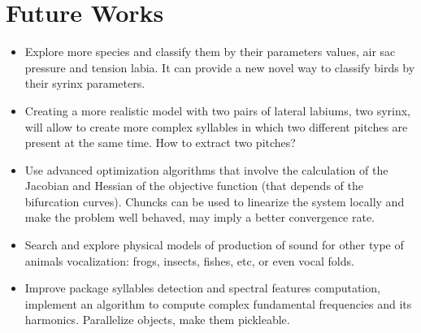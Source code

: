 \section{Future Works}

\begin{itemize}
    \item Explore more species and classify them by their parameters values, air sac pressure and tension labia. It can provide a new novel way to classify birds by their syrinx parameters.
    
    \item Creating a more realistic model with two pairs of lateral labiums, two syrinx, will allow to create more complex syllables in which two different pitches are present at the same time. How to extract two pitches?
    
    \item Use advanced optimization algorithms that involve the calculation of the Jacobian and Hessian of the objective function (that depends of the bifurcation curves). Chuncks can be used to linearize the system locally and make the problem well behaved, may imply a better convergence rate.
    
    \item Search and explore physical models of production of sound for other type of animals vocalization: frogs, insects, fishes, etc, or even vocal folds.
    
    \item Improve package syllables detection and spectral features computation, implement an algorithm to compute complex fundamental frequencies and its harmonics. Parallelize objects, make them pickleable.
    
\end{itemize}